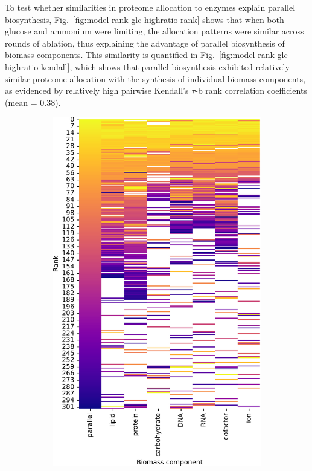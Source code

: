 To test whether similarities in proteome allocation to enzymes explain parallel biosynthesis, Fig.\ \ref{fig:model-rank-glc-highratio-rank} shows that when both glucose and ammonium were limiting, the allocation patterns were similar across rounds of ablation, thus explaining the advantage of parallel biosynthesis of biomass components.
This similarity is quantified in Fig.\ \ref{fig:model-rank-glc-highratio-kendall}, which shows that parallel biosynthesis exhibited relatively similar proteome allocation with the synthesis of individual biomass components, as evidenced by relatively high pairwise Kendall's $\tau$-b rank correlation coefficients (mean = 0.38).

\begin{figure}[htbp!]
  \centering
  \begin{subfigure}[t]{0.45\textwidth}
  \centering
    \includegraphics[width=\linewidth]{CompareEnzUse_glc01p69_pyrUnres_amm01p05_1.pdf}

\end{subfigure}
\end{figure}
